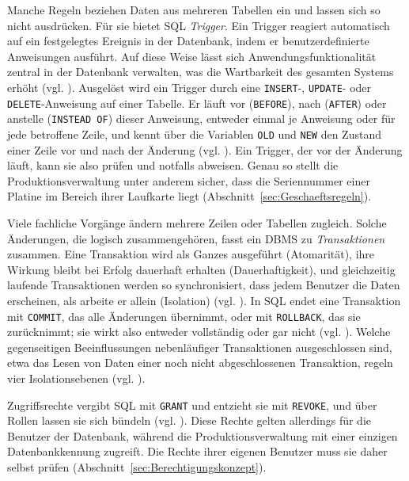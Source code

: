Manche Regeln beziehen Daten aus mehreren Tabellen ein und lassen sich so nicht
ausdrücken. Für sie bietet SQL \emph{Trigger}. Ein Trigger reagiert automatisch
auf ein festgelegtes Ereignis in der Datenbank, indem er benutzerdefinierte
Anweisungen ausführt. Auf diese Weise lässt sich Anwendungsfunktionalität
zentral in der Datenbank verwalten, was die Wartbarkeit des gesamten Systems
erhöht (vgl. \cite[S.~100]{kudrassTaschenbuchDatenbankspracheSQL}). Ausgelöst
wird ein Trigger durch eine \texttt{INSERT}-, \texttt{UPDATE}- oder
\texttt{DELETE}-Anweisung auf einer Tabelle. Er läuft vor (\texttt{BEFORE}),
nach (\texttt{AFTER}) oder anstelle (\texttt{INSTEAD OF}) dieser Anweisung,
entweder einmal je Anweisung oder für jede betroffene Zeile, und kennt über die
Variablen \texttt{OLD} und \texttt{NEW} den Zustand einer Zeile vor und nach der
Änderung (vgl. \cite[S.~137]{kudrassTaschenbuchDatenbankspracheSQL}). Ein
Trigger, der vor der Änderung läuft, kann sie also prüfen und notfalls abweisen.
Genau so stellt die Produktionsverwaltung unter anderem sicher, dass die
Seriennummer einer Platine im Bereich ihrer Laufkarte liegt
(Abschnitt~\ref{sec:Geschaeftsregeln}).

Viele fachliche Vorgänge ändern mehrere Zeilen oder Tabellen zugleich. Solche
Änderungen, die logisch zusammengehören, fasst ein DBMS zu \emph{Transaktionen}
zusammen. Eine Transaktion wird als Ganzes ausgeführt (Atomarität), ihre
Wirkung bleibt bei Erfolg dauerhaft erhalten (Dauerhaftigkeit), und
gleichzeitig laufende Transaktionen werden so synchronisiert, dass jedem
Benutzer die Daten erscheinen, als arbeite er allein (Isolation) (vgl.
\cite[S.~24]{kudrassDatenbankenGrundlagenUnd2015}). In SQL endet eine
Transaktion mit \texttt{COMMIT}, das alle Änderungen übernimmt, oder mit
\texttt{ROLLBACK}, das sie zurücknimmt; sie wirkt also entweder vollständig oder
gar nicht (vgl. \cite[S.~138\,f.]{kudrassTaschenbuchDatenbankspracheSQL}).
Welche gegenseitigen Beeinflussungen nebenläufiger Transaktionen ausgeschlossen
sind, etwa das Lesen von Daten einer noch nicht abgeschlossenen Transaktion,
regeln vier Isolationsebenen (vgl.
\cite[S.~140]{kudrassTaschenbuchDatenbankspracheSQL}).

Zugriffsrechte vergibt SQL mit \texttt{GRANT} und entzieht sie mit
\texttt{REVOKE}, und über Rollen lassen sie sich bündeln (vgl.
\cite[S.~141--143]{kudrassTaschenbuchDatenbankspracheSQL}). Diese Rechte gelten
allerdings für die Benutzer der Datenbank, während die Produktionsverwaltung mit
einer einzigen Datenbankkennung zugreift. Die Rechte ihrer eigenen Benutzer muss
sie daher selbst prüfen (Abschnitt~\ref{sec:Berechtigungskonzept}).

